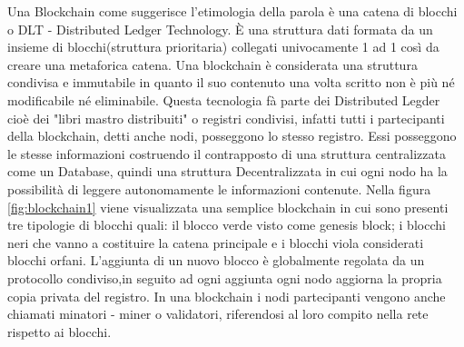 \documentclass[11pt,a4paper,titlepage,twoside,openright]{report}
\begin{document}
Una Blockchain come suggerisce l'etimologia della parola è una catena di blocchi o DLT - Distributed Ledger Technology. È una struttura dati formata da un insieme di blocchi(struttura prioritaria) collegati univocamente 1 ad 1 così da creare una metaforica catena. Una blockchain è considerata una struttura condivisa e immutabile in quanto il suo contenuto una volta scritto non è più né modificabile né eliminabile. Questa tecnologia fà parte dei Distributed Legder cioè dei "libri mastro distribuiti" o registri condivisi, infatti tutti i partecipanti della blockchain, detti anche nodi, posseggono lo stesso registro. Essi posseggono le stesse informazioni costruendo il contrapposto di una struttura centralizzata come un Database, quindi una struttura Decentralizzata in cui ogni nodo ha la possibilità di leggere autonomamente le informazioni contenute.
Nella figura \ref{fig:blockchain1} viene visualizzata una semplice blockchain in cui sono presenti tre tipologie di blocchi quali: il blocco verde visto come genesis block; i blocchi neri che vanno a costituire la catena principale e i blocchi viola considerati blocchi orfani. L'aggiunta di un nuovo blocco è globalmente regolata da un protocollo condiviso,in seguito ad ogni aggiunta ogni nodo aggiorna la propria copia privata del registro. In una blockchain i nodi partecipanti vengono anche chiamati minatori - miner o validatori, riferendosi al loro compito nella rete rispetto ai blocchi.
\end{document}
